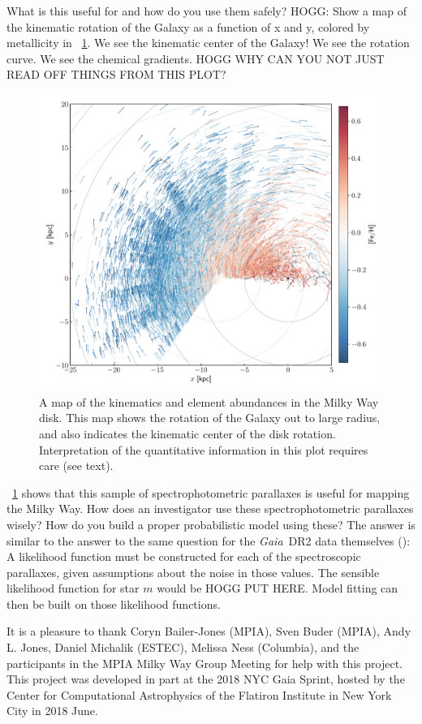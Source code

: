 \documentclass[modern]{aastex62}
\newcommand{\acronym}[1]{{\small{#1}}}
\newcommand{\project}[1]{\textsl{#1}}
\newcommand{\gaia}{\project{Gaia}}
\begin{document}
What is this useful for and how do you use them safely?
HOGG: Show a map of the kinematic rotation of the Galaxy as a function of
x and y, colored by metallicity in \figurename~\ref{fig:disk}.
We see the kinematic center of the Galaxy! We see the rotation curve.
We see the chemical gradients. HOGG WHY CAN YOU NOT JUST READ OFF THINGS FROM THIS PLOT?
\begin{figure}
\includegraphics[width=\textwidth]{map.pdf}
\caption{A map of the kinematics and element abundances in the Milky Way disk.
  This map shows the rotation of the Galaxy out to large radius, and also
  indicates the kinematic center of the disk rotation. Interpretation of
  the quantitative information in this plot requires care (see text).\label{fig:disk}}
\end{figure}

\figurename~\ref{fig:disk} shows that this sample of spectrophotometric parallaxes is useful for
mapping the Milky Way.
How does an investigator use these spectrophotometric parallaxes wisely?
How do you build a proper probabilistic model using these?
The answer is similar to the answer to the same question for the \gaia\ \acronym{DR2} data
themselves (\citealt{gaialf}): A likelihood function must be constructed for each of the
spectroscopic parallaxes, given assumptions about the noise in those values.
The sensible likelihood function for star $m$ would be HOGG PUT HERE.
Model fitting can then be built on those likelihood functions.

\acknowledgements
It is a pleasure to thank
  Coryn Bailer-Jones (\acronym{MPIA}),
  Sven Buder (\acronym{MPIA}),
  Andy L. Jones,
  Daniel Michalik (\acronym{ESTEC}),
  Melissa Ness (Columbia),
  and the participants in the \acronym{MPIA} Milky Way Group Meeting
for help with this project.
This project was developed in part at the
2018 \acronym{NYC} Gaia Sprint, hosted by the Center for Computational Astrophysics of
the Flatiron Institute in New York City in 2018 June.
\end{document}
